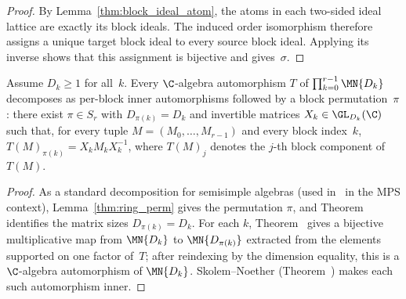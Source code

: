 \begin{proof}
    \leanok
    By Lemma~\ref{thm:block_ideal_atom}, the atoms in each two-sided ideal
    lattice are exactly its block ideals. The induced order isomorphism
    therefore assigns a unique target block ideal to every source block
    ideal. Applying its inverse shows that this assignment is bijective and
    gives~$\sigma$.
\end{proof}

\begin{lemma}\label{thm:pi_auto_decomp}
    \leanok
    Assume $D_k \ge 1$ for all~$k$.
    Every $\C$-algebra automorphism $T$ of $\prod_{k=0}^{r-1} \MN{D_k}$
    decomposes as per-block inner automorphisms followed by a block
    permutation~$\pi$:
    there exist $\pi \in S_r$ with $D_{\pi(k)} = D_k$
    and invertible matrices $X_k \in \GL_{D_k}(\C)$ such that,
    for every tuple $M = (M_0,\ldots,M_{r-1})$ and every block index~$k$,
    $T(M)_{\pi(k)} = X_k M_k X_k^{-1}$,
    where $T(M)_j$ denotes the $j$-th block component of $T(M)$.
\end{lemma}

\begin{proof}
    \leanok
    As a standard decomposition for semisimple algebras (used in~\cite[Section~IV.A]{Cirac2021Matrix} in the MPS context),
    Lemma~\ref{thm:ring_perm} gives the permutation $\pi$, and
    Theorem~\cite[``Summand matching and dimension preservation'']{QICLean2026Blueprint} identifies the matrix sizes
    $D_{\pi(k)} = D_k$.
    For each $k$, Theorem~\cite[``Paired component maps are bijections'']{QICLean2026Blueprint} gives a bijective
    multiplicative map from $\MN{D_k}$ to $\MN{D_{\pi(k)}}$ extracted from the
    elements supported on one factor of~$T$; after reindexing by the dimension equality,
    this is a $\C$-algebra automorphism of $\MN{D_k}$.
    Skolem--Noether (Theorem~\cite[``Skolem--Noether'']{QICLean2026Blueprint}) makes each such
    automorphism inner.
\end{proof}

